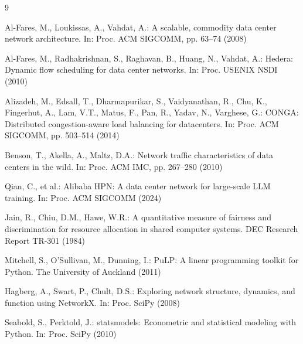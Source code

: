 \documentclass[runningheads]{llncs}
\begin{document}

\begin{thebibliography}{9}

Al-Fares, M., Loukissas, A., Vahdat, A.:
A scalable, commodity data center network architecture.
In: Proc. ACM SIGCOMM, pp. 63--74 (2008)

Al-Fares, M., Radhakrishnan, S., Raghavan, B., Huang, N., Vahdat, A.:
Hedera: Dynamic flow scheduling for data center networks.
In: Proc. USENIX NSDI (2010)

Alizadeh, M., Edsall, T., Dharmapurikar, S., Vaidyanathan, R., Chu, K., Fingerhut, A., Lam, V.T., Matus, F., Pan, R., Yadav, N., Varghese, G.:
CONGA: Distributed congestion-aware load balancing for datacenters.
In: Proc. ACM SIGCOMM, pp. 503--514 (2014)

Benson, T., Akella, A., Maltz, D.A.:
Network traffic characteristics of data centers in the wild.
In: Proc. ACM IMC, pp. 267--280 (2010)

Qian, C., et al.:
Alibaba HPN: A data center network for large-scale LLM training.
In: Proc. ACM SIGCOMM (2024)

Jain, R., Chiu, D.M., Hawe, W.R.:
A quantitative measure of fairness and discrimination for resource allocation
in shared computer systems.
DEC Research Report TR-301 (1984)

Mitchell, S., O'Sullivan, M., Dunning, I.:
PuLP: A linear programming toolkit for Python.
The University of Auckland (2011)

Hagberg, A., Swart, P., Chult, D.S.:
Exploring network structure, dynamics, and function using NetworkX.
In: Proc. SciPy (2008)

Seabold, S., Perktold, J.:
statsmodels: Econometric and statistical modeling with Python.
In: Proc. SciPy (2010)

\end{thebibliography}
\end{document}
